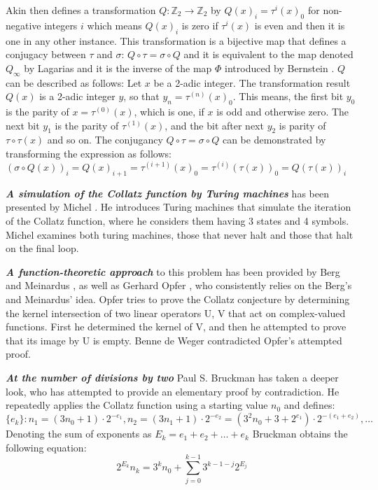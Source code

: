 \par\medskip
Akin then defines a transformation $Q:\mathbb{Z}_2\rightarrow\mathbb{Z}_2$ by $Q(x)_i=\tau^i(x)_0$ for non-negative integers $i$ which means $Q(x)_i$ is zero if $\tau^i(x)$ is even and then it is one in any other instance. This transformation is a bijective map that defines a conjugacy between $\tau$ and $\sigma$: $Q\circ\tau=\sigma\circ Q$ and it is equivalent to the map denoted $Q_\infty$ by Lagarias \cite{Ref_Lagarias_1985} and it is the inverse of the map $\Phi$ introduced by Bernstein \cite{Ref_Bernstein_Lagarias_1996}. $Q$ can be described as follows: Let $x$ be a 2-adic integer. The transformation result $Q(x)$ is a 2-adic integer $y$, so that $y_n=\tau^{(n)}(x)_0$. This means, the first bit $y_0$ is the parity of $x=\tau^{(0)}(x)$, which is one, if $x$ is odd and otherwise zero. The next bit $y_1$ is the parity of $\tau^{(1)}(x)$, and the bit after next $y_2$ is parity of $\tau\circ\tau(x)$ and so on. The conjugancy $Q\circ\tau=\sigma\circ Q$ can be demonstrated by transforming the expression as follows: $(\sigma\circ Q(x))_i=Q(x)_{i+1}=\tau^{(i+1)}(x)_0=\tau^{(i)}(\tau(x))_0=Q(\tau(x))_i$

\par\medskip
\textit{\textbf{A simulation of the Collatz function by Turing machines}} has been presented by Michel \cite{Ref_Michel_2014}. He introduces Turing machines that simulate the iteration of the Collatz function, where he considers them having 3 states and 4 symbols. Michel examines both turing machines, those that never halt and those that halt on the final loop.

\par\medskip
\textit{\textbf{A function-theoretic approach}} to this problem has been provided by Berg and Meinardus \cite{Ref_Berg_Meinardus_1994}, \cite{Ref_Berg_Meinardus_1995} as well as Gerhard Opfer \cite{Ref_Opfer_2011}, who consistently relies on the Berg’s and Meinardus’ idea. Opfer tries to prove the Collatz conjecture by determining the kernel intersection of two linear operators U, V that act on complex-valued functions. First he determined the kernel of V, and then he attempted to prove that its image by U is empty. Benne de Weger \cite{Ref_de_Weger_2011} contradicted Opfer’s attempted proof.

\par\medskip
\textit{\textbf{At the number of divisions by two}} Paul S. Bruckman \cite{Ref_Bruckman_2008} has taken a deeper look, who has attempted to provide an elementary proof by contradiction. He repeatedly applies the Collatz function using a starting value $n_0$ and defines:
\[
\{e_k\}:n_1=(3n_0+1)\cdot2^{-e_1},n_2=(3n_1+1)\cdot2^{-e_2}=(3^2n_0+3+2^{e_1})\cdot2^{-(e_1+e_2)},\ldots
\]
Denoting the sum of exponents as $E_k=e_1+e_2+\ldots+e_k$ Bruckman obtains the following equation:
\[
2^{E_k}n_k=3^kn_0+\sum_{j=0}^{k-1}3^{k-1-j}2^{E_j}
\]

